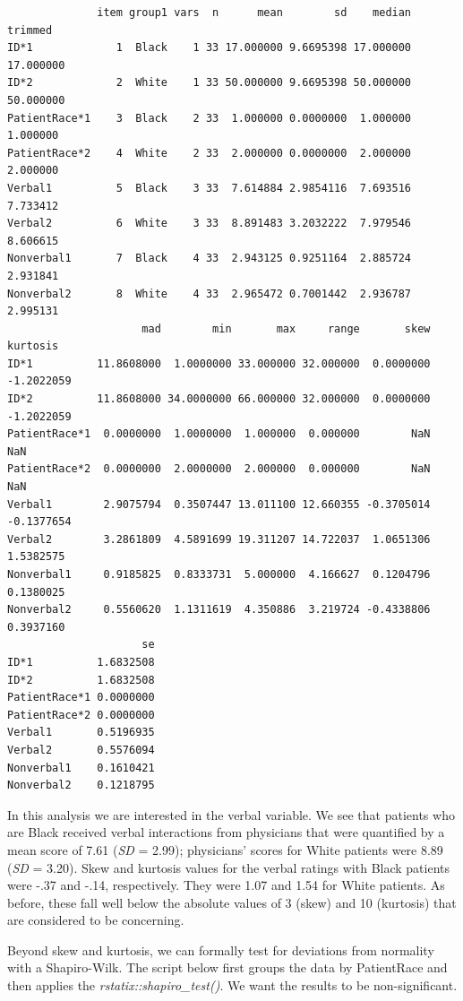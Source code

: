 \documentclass[
  11pt,
]{book}
\begin{document}
\begin{verbatim}
              item group1 vars  n      mean        sd    median   trimmed
ID*1             1  Black    1 33 17.000000 9.6695398 17.000000 17.000000
ID*2             2  White    1 33 50.000000 9.6695398 50.000000 50.000000
PatientRace*1    3  Black    2 33  1.000000 0.0000000  1.000000  1.000000
PatientRace*2    4  White    2 33  2.000000 0.0000000  2.000000  2.000000
Verbal1          5  Black    3 33  7.614884 2.9854116  7.693516  7.733412
Verbal2          6  White    3 33  8.891483 3.2032222  7.979546  8.606615
Nonverbal1       7  Black    4 33  2.943125 0.9251164  2.885724  2.931841
Nonverbal2       8  White    4 33  2.965472 0.7001442  2.936787  2.995131
                     mad        min       max     range       skew   kurtosis
ID*1          11.8608000  1.0000000 33.000000 32.000000  0.0000000 -1.2022059
ID*2          11.8608000 34.0000000 66.000000 32.000000  0.0000000 -1.2022059
PatientRace*1  0.0000000  1.0000000  1.000000  0.000000        NaN        NaN
PatientRace*2  0.0000000  2.0000000  2.000000  0.000000        NaN        NaN
Verbal1        2.9075794  0.3507447 13.011100 12.660355 -0.3705014 -0.1377654
Verbal2        3.2861809  4.5891699 19.311207 14.722037  1.0651306  1.5382575
Nonverbal1     0.9185825  0.8333731  5.000000  4.166627  0.1204796  0.1380025
Nonverbal2     0.5560620  1.1311619  4.350886  3.219724 -0.4338806  0.3937160
                     se
ID*1          1.6832508
ID*2          1.6832508
PatientRace*1 0.0000000
PatientRace*2 0.0000000
Verbal1       0.5196935
Verbal2       0.5576094
Nonverbal1    0.1610421
Nonverbal2    0.1218795
\end{verbatim}

In this analysis we are interested in the verbal variable. We see that patients who are Black received verbal interactions from physicians that were quantified by a mean score of 7.61 (\emph{SD} = 2.99); physicians' scores for White patients were 8.89 (\emph{SD} = 3.20). Skew and kurtosis values for the verbal ratings with Black patients were -.37 and -.14, respectively. They were 1.07 and 1.54 for White patients. As before, these fall well below the absolute values of 3 (skew) and 10 (kurtosis) that are considered to be concerning.

Beyond skew and kurtosis, we can formally test for deviations from normality with a Shapiro-Wilk. The script below first groups the data by PatientRace and then applies the \emph{rstatix::shapiro\_test()}. We want the results to be non-significant.
\end{document}
